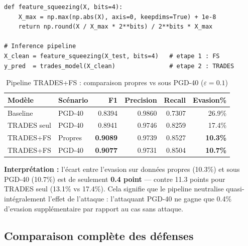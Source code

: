 \documentclass[11pt,a4paper]{article}
\begin{document}
\begin{lstlisting}[caption={Pipeline TRADES + Feature Squeezing \`a l'inf\'erence}]
def feature_squeezing(X, bits=4):
    X_max = np.max(np.abs(X), axis=0, keepdims=True) + 1e-8
    return np.round(X / X_max * 2**bits) / 2**bits * X_max

# Inference pipeline
X_clean = feature_squeezing(X_test, bits=4)   # etape 1 : FS
y_pred  = trades_model(X_clean)               # etape 2 : TRADES
\end{lstlisting}

\begin{table}[H]
\centering
\caption{Pipeline TRADES+FS : comparaison propres vs sous PGD-40 ($\varepsilon=0.1$)}
\begin{tabular}{llrrrr}
\toprule
\textbf{Mod\`ele} & \textbf{Sc\'enario} & \textbf{F1} & \textbf{Precision} & \textbf{Recall} & \textbf{Evasion\%} \\
\midrule
Baseline          & PGD-40  & 0.8394 & 0.9860 & 0.7307 & 26.9\% \\
TRADES seul       & PGD-40  & 0.8941 & 0.9746 & 0.8259 & 17.4\% \\
\rowcolor{inptblue!20}
TRADES+FS         & Propres & \textbf{0.9089} & 0.9739 & 0.8527 & \textbf{10.3\%} \\
\rowcolor{inptblue!30}
TRADES+FS         & PGD-40  & \textbf{0.9077} & 0.9731 & 0.8504 & \textbf{10.7\%} \\
\bottomrule
\end{tabular}
\end{table}

\textbf{Interpr\'etation :} l'\'ecart entre l'evasion sur donn\'ees propres (10.3\%) et sous PGD-40 (10.7\%)
est de seulement \textbf{0.4 point} --- contre 11.3 points pour TRADES seul (13.1\% vs 17.4\%).
Cela signifie que le pipeline neutralise quasi-int\'egralement l'effet de l'attaque :
l'attaquant PGD-40 ne gagne que 0.4\% d'evasion suppl\'ementaire par rapport au cas sans attaque.

\subsection{Comparaison compl\`ete des d\'efenses}
\end{document}
